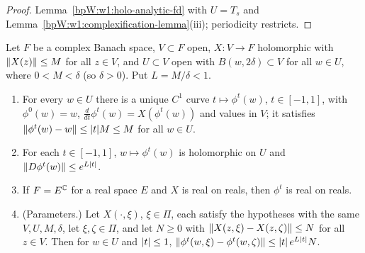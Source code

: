 \begin{proof}
Lemma~\ref{bpW:w1:holo-analytic-fd} with $U=T_s$ and Lemma~\ref{bpW:w1:complexification-lemma}(iii); periodicity
restricts.
\end{proof}

\begin{lemma}\label{bpW:w1:flow}
Let $F$ be a complex Banach space, $V\subset F$ open, $X:V\to F$ holomorphic with $\lVert X(z)\rVert\le M$ for all $z\in V$,
and $U\subset V$ open with $B(w,2\delta)\subset V$ for all $w\in U$, where $0<M<\delta$ (so $\delta>0$). Put
$L=M/\delta<1$.
\begin{enumerate}[label=(\roman*)]
\item For every $w\in U$ there is a unique $C^1$ curve $t\mapsto\phi^t(w)$, $t\in[-1,1]$, with $\phi^0(w)=w$,
  $\frac{d}{dt}\phi^t(w)=X(\phi^t(w))$ and values in $V$; it satisfies $\lVert \phi^t(w)-w\rVert\le\lvert t\rvert M\le M$ for all
  $w\in U$.
\item For each $t\in[-1,1]$, $w\mapsto\phi^t(w)$ is holomorphic on $U$ and $\lVert D\phi^t(w)\rVert\le e^{L\lvert t\rvert}$.
\item If $F=E^{\mathbb{C}}$ for a real space $E$ and $X$ is real on reals, then $\phi^t$ is real on reals.
\item (Parameters.) Let $X(\cdot,\xi)$, $\xi\in\Pi$, each satisfy the hypotheses with the same $V,U,M,\delta$, let
  $\xi,\zeta\in\Pi$, and let $N\ge0$ with $\lVert X(z,\xi)-X(z,\zeta)\rVert\le N$ for all $z\in V$. Then for $w\in U$ and
  $\lvert t\rvert\le1$, $\lVert \phi^t(w,\xi)-\phi^t(w,\zeta)\rVert\le\lvert t\rvert\,e^{L\lvert t\rvert}N$.
\end{enumerate}
\end{lemma}


